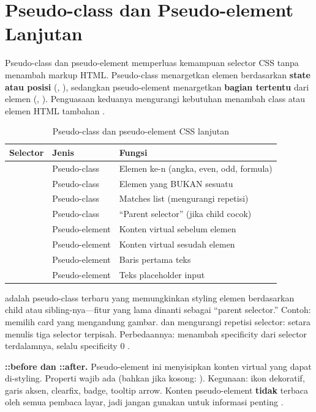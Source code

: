 \section{Pseudo-class dan Pseudo-element Lanjutan}

Pseudo-class dan pseudo-element memperluas kemampuan selector CSS tanpa menambah markup HTML. Pseudo-class menargetkan elemen berdasarkan \textbf{state atau posisi} (, ), sedangkan pseudo-element menargetkan \textbf{bagian tertentu} dari elemen (, ). Penguasaan keduanya mengurangi kebutuhan menambah class atau elemen HTML tambahan \cite{mdnCss}.

\begin{table}[htbp]
\centering
\begin{tabular}{|P{3cm}|P{3cm}|P{6cm}|}
\hline
\textbf{Selector} & \textbf{Jenis} & \textbf{Fungsi} \\
\hline
{} & Pseudo-class & Elemen ke-n (angka, even, odd, formula) \\
\hline
{} & Pseudo-class & Elemen yang BUKAN sesuatu \\
\hline
{} & Pseudo-class & Matches list (mengurangi repetisi) \\
\hline
{} & Pseudo-class & ``Parent selector'' (jika child cocok) \\
\hline
{} & Pseudo-element & Konten virtual sebelum elemen \\
\hline
{} & Pseudo-element & Konten virtual sesudah elemen \\
\hline
{} & Pseudo-element & Baris pertama teks \\
\hline
{} & Pseudo-element & Teks placeholder input \\
\hline
\end{tabular}
\caption{Pseudo-class dan pseudo-element CSS lanjutan}
\end{table}

 adalah pseudo-class terbaru yang memungkinkan styling elemen berdasarkan child atau sibling-nya---fitur yang lama dinanti sebagai ``parent selector.'' Contoh:  memilih card yang mengandung gambar.  dan  mengurangi repetisi selector:  setara menulis tiga selector terpisah. Perbedaannya:  menambah specificity dari selector terdalamnya,  selalu specificity 0 \cite{webdevCss}.

\begin{konsep}
\textbf{::before dan ::after.} Pseudo-element ini menyisipkan konten virtual yang dapat di-styling. Properti  wajib ada (bahkan jika kosong: ). Kegunaan: ikon dekoratif, garis aksen, clearfix, badge, tooltip arrow. Konten pseudo-element \textbf{tidak} terbaca oleh semua pembaca layar, jadi jangan gunakan untuk informasi penting \cite{mdnAccessibility}.
\end{konsep}

